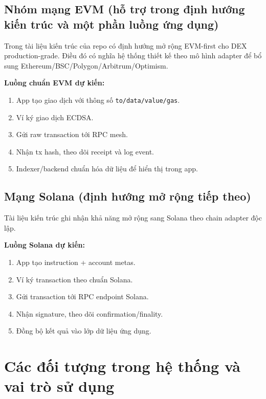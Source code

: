 \documentclass[a4paper,12pt]{report}
\begin{document}
\subsection{Nhóm mạng EVM (hỗ trợ trong định hướng kiến trúc và một phần luồng ứng dụng)}
Trong tài liệu kiến trúc của repo có định hướng mở rộng EVM-first cho DEX production-grade. Điều đó có nghĩa hệ thống thiết kế theo mô hình adapter để bổ sung Ethereum/BSC/Polygon/Arbitrum/Optimism.

\textbf{Luồng chuẩn EVM dự kiến:}
\begin{enumerate}
    \item App tạo giao dịch với thông số \texttt{to/data/value/gas}.
    \item Ví ký giao dịch ECDSA.
    \item Gửi raw transaction tới RPC mesh.
    \item Nhận tx hash, theo dõi receipt và log event.
    \item Indexer/backend chuẩn hóa dữ liệu để hiển thị trong app.
\end{enumerate}

\subsection{Mạng Solana (định hướng mở rộng tiếp theo)}
Tài liệu kiến trúc ghi nhận khả năng mở rộng sang Solana theo chain adapter độc lập.

\textbf{Luồng Solana dự kiến:}
\begin{enumerate}
    \item App tạo instruction + account metas.
    \item Ví ký transaction theo chuẩn Solana.
    \item Gửi transaction tới RPC endpoint Solana.
    \item Nhận signature, theo dõi confirmation/finality.
    \item Đồng bộ kết quả vào lớp dữ liệu ứng dụng.
\end{enumerate}

\section{Các đối tượng trong hệ thống và vai trò sử dụng}
\end{document}

